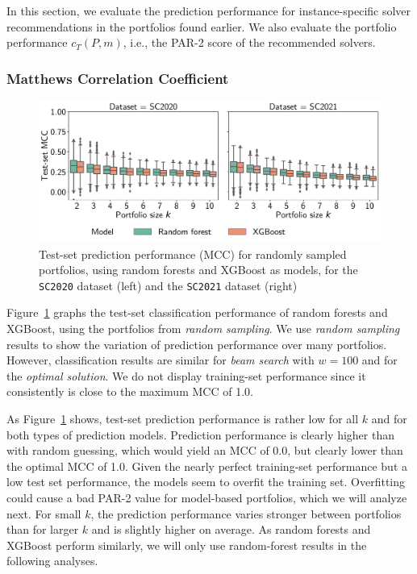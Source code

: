 \documentclass[a4paper,USenglish,pdfa]{lipics-v2021} %
\begin{document}
In this section, we evaluate the prediction performance for instance-specific solver recommendations in the portfolios found earlier. 
We also evaluate the portfolio performance $c_T(P,m)$, i.e., the PAR-2 score of the recommended solvers.

\subsubsection{Matthews Correlation Coefficient}

\begin{figure}[tb]
	\centering
	\includegraphics[width=\columnwidth]{plots/prediction-test-mcc.pdf}
	\caption{
		Test-set prediction performance (MCC) for randomly sampled portfolios, using random forests and XGBoost as models, for the \texttt{SC2020} dataset (left) and the \texttt{SC2021} dataset (right)
	}
	\label{fig:prediction-test-mcc}
\end{figure}

Figure~\ref{fig:prediction-test-mcc} graphs the test-set classification performance of random forests and XGBoost, using the portfolios from \emph{random sampling}.
We use \emph{random sampling} results to show the variation of prediction performance over many portfolios.
However, classification results are similar for \emph{beam search} with $w=100$ and for the \emph{optimal solution}.
We do not display training-set performance since it consistently is close to the maximum MCC of 1.0.

As Figure~\ref{fig:prediction-test-mcc} shows, test-set prediction performance is rather low for all $k$ and for both types of prediction models.
Prediction performance is clearly higher than with random guessing, which would yield an MCC of 0.0, but clearly lower than the optimal MCC of 1.0.
Given the nearly perfect training-set performance but a low test set performance, the models seem to overfit the training set.
Overfitting could cause a bad PAR-2 value for model-based portfolios, which we will analyze next.
For small $k$, the prediction performance varies stronger between portfolios than for larger $k$ and is slightly higher on average.
As random forests and XGBoost perform similarly, we will only use random-forest results in the following analyses.
\end{document}
